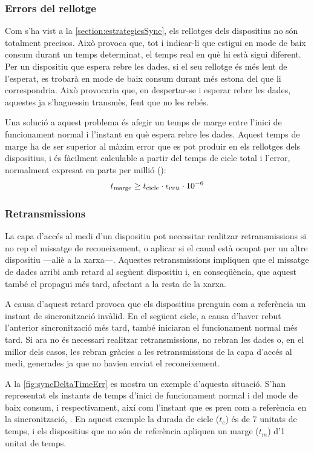 \documentclass{tfgitic}[2024/07/01]
\begin{document}
{\subsubsection{Errors del rellotge}
Com s'ha vist a la \autoref{section:estrategiesSync}, els rellotges dels dispositius no són totalment precisos. Això provoca que, tot i indicar-li que estigui en mode de baix consum durant un temps determinat, el temps real en què hi està sigui diferent. Per un dispositiu que espera rebre les dades, si el seu rellotge és més lent de l'esperat, es trobarà en mode de baix consum durant més estona del que li correspondria. Això provocaria que, en despertar-se i esperar rebre les dades, aquestes ja s'haguessin transmès, fent que no les rebés.
    
Una solució a aquest problema és afegir un temps de marge entre l'inici de funcionament normal i l'instant en què espera rebre les dades. Aquest temps de marge ha de ser superior al màxim error que es pot produir en els rellotges dels dispositius, i és fàcilment calculable a partir del temps de cicle total i l'error, normalment expresat en parts per millió ():
\begin{equation}
    t_{\text{marge}} \geq t_{\text{cicle}} \cdot \epsilon_{\text{\textsc{ppm}}} \cdot 10^{-6}
    \label{eq:temps_marge}
\end{equation}

\subsubsection{Retransmissions}
La capa d'accés al medi d'un dispositiu pot necessitar realitzar retransmissions si no rep el missatge de reconeixement, o aplicar  si el canal està ocupat per un altre dispositiu ---aliè a la xarxa---. Aquestes retransmissions impliquen que el missatge de dades arribi amb retard al següent dispositiu i, en conseqüència, que aquest també el propagui més tard, afectant a la resta de la xarxa. 
    
A causa d'aquest retard provoca que els dispositius prenguin com a referència un instant de sincronització invàlid. En el següent cicle, a causa d'haver rebut l'anterior sincronització més tard, també iniciaran el funcionament normal més tard. Si ara no és necessari realitzar retransmissions, no rebran les dades o, en el millor dels casos, les rebran gràcies a les retransmissions de la capa d'accés al medi, generades ja que no havien enviat el reconeixement.

A la \autoref{fig:syncDeltaTimeErr} es mostra un exemple d'aquesta situació. S'han representat els instants de temps d'inici de funcionament normal i del mode de baix consum,  i  respectivament, així com l'instant que es pren com a referència en la sincronització, . En aquest exemple la durada de cicle ($t_c$) és de 7 unitats de temps, i els dispositius que no són de referència apliquen un marge ($t_m$) d'1 unitat de temps. 

}
\end{document}
